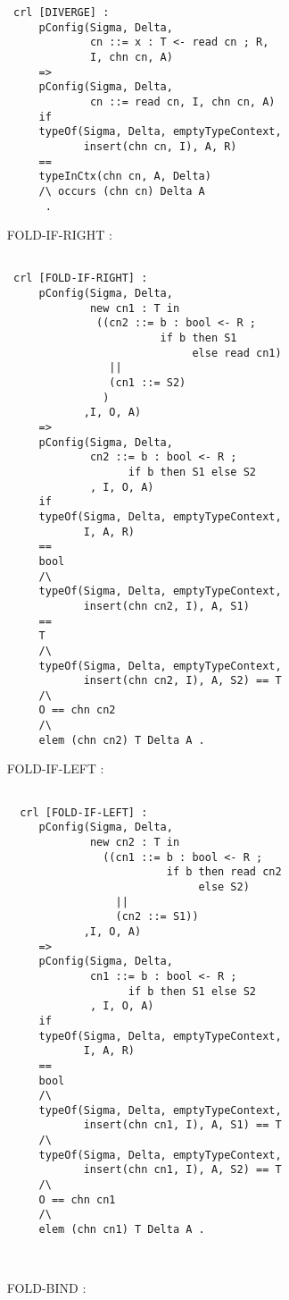 \documentclass{article}
\begin{document}
\begin{itemize}
\begin{lstlisting}
 crl [DIVERGE] :
     pConfig(Sigma, Delta, 
             cn ::= x : T <- read cn ; R, 
             I, chn cn, A)
     =>
     pConfig(Sigma, Delta, 
             cn ::= read cn, I, chn cn, A)
     if
     typeOf(Sigma, Delta, emptyTypeContext, 
            insert(chn cn, I), A, R)
     == 
     typeInCtx(chn cn, A, Delta)
     /\ occurs (chn cn) Delta A
      .

     \end{lstlisting} 
\item[FOLD-IF-RIGHT]:
\begin{lstlisting}  

 crl [FOLD-IF-RIGHT] :
     pConfig(Sigma, Delta,
             new cn1 : T in 
              ((cn2 ::= b : bool <- R ;
                        if b then S1 
                             else read cn1)
                ||
                (cn1 ::= S2)
               )
            ,I, O, A)
     => 
     pConfig(Sigma, Delta,
             cn2 ::= b : bool <- R ;
                   if b then S1 else S2
             , I, O, A)
     if
     typeOf(Sigma, Delta, emptyTypeContext, 
            I, A, R) 
     == 
     bool
     /\
     typeOf(Sigma, Delta, emptyTypeContext, 
            insert(chn cn2, I), A, S1) 
     == 
     T
     /\
     typeOf(Sigma, Delta, emptyTypeContext, 
            insert(chn cn2, I), A, S2) == T
     /\
     O == chn cn2 
     /\
     elem (chn cn2) T Delta A .

     \end{lstlisting} 
\item[FOLD-IF-LEFT]:
\begin{lstlisting}  
    
  crl [FOLD-IF-LEFT] :
     pConfig(Sigma, Delta,
             new cn2 : T in 
               ((cn1 ::= b : bool <- R ;
                         if b then read cn2 
                              else S2)
                 ||
                 (cn2 ::= S1))
            ,I, O, A)
     => 
     pConfig(Sigma, Delta,
             cn1 ::= b : bool <- R ;
                   if b then S1 else S2
             , I, O, A)
     if
     typeOf(Sigma, Delta, emptyTypeContext,   
            I, A, R) 
     == 
     bool
     /\
     typeOf(Sigma, Delta, emptyTypeContext,
            insert(chn cn1, I), A, S1) == T
     /\
     typeOf(Sigma, Delta, emptyTypeContext, 
            insert(chn cn1, I), A, S2) == T
     /\
     O == chn cn1 
     /\
     elem (chn cn1) T Delta A .
     
 
     \end{lstlisting} 
\item[FOLD-BIND]:
\begin{lstlisting}      


\end{lstlisting}
\end{itemize}
\end{document}
